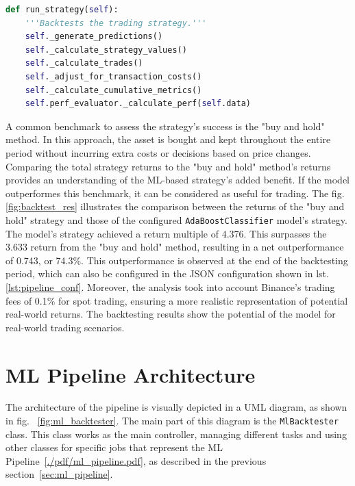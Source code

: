 \noindent\begin{minipage}{\linewidth}
\begin{lstlisting}[style=pythonstyle, language=Python, caption={\vspace*{1cm}Function of MlBacktester class for backtesting execution.},  captionpos=b, label=lst:add_features_function]
def run_strategy(self):
    '''Backtests the trading strategy.'''
    self._generate_predictions()
    self._calculate_strategy_values()
    self._calculate_trades()
    self._adjust_for_transaction_costs()
    self._calculate_cumulative_metrics()
    self.perf_evaluator._calculate_perf(self.data)

\end{lstlisting}
\end{minipage}

A common benchmark to assess the strategy's success is the "buy and hold" method.
In this approach, the asset is bought and kept throughout the entire period without incurring extra costs or decisions based on price changes.
Comparing the total strategy returns to the "buy and hold" method's returns provides an understanding of the ML-based strategy's added benefit.
If the model outperformes this benchmark, it can be considered as useful for trading. The fig. \ref{fig:backtest_res} illustrates the comparison between the returns of the "buy and hold" strategy and those of the configured \texttt{AdaBoostClassifier} model's strategy.
The model's strategy achieved a return multiple of 4.376. This surpasses the 3.633 return from the "buy and hold" method, resulting in a net outperformance of 0.743, or 74.3\%.
This outperformance is observed at the end of the backtesting period, which can also be configured in the JSON configuration shown in lst. \ref{lst:pipeline_conf}.
Moreover, the analysis took into account Binance's trading fees of 0.1\% for spot trading, ensuring a more realistic representation of potential real-world returns.
The backtesting results show the potential of the model for real-world trading scenarios.


\section{ML Pipeline Architecture}

The architecture of the pipeline is visually depicted in a UML diagram, as shown in fig. ~\ref{fig:ml_backtester}.
The main part of this diagram is the \texttt{MlBacktester} class. This class works as the main controller, managing different tasks and using other classes for specific jobs that represent the ML Pipeline~\ref{./pdf/ml_pipeline.pdf}, as described in the previous section~\ref{sec:ml_pipeline}.

